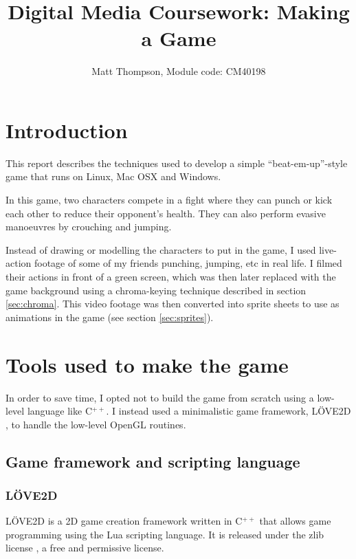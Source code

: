 \documentclass[11pt]{article}
\title{Digital Media Coursework: Making a Game}
\author{Matt Thompson, Module code: CM40198}
\begin{document}
\maketitle
\clearpage
\tableofcontents
\clearpage


\section{Introduction}
This report describes the techniques used to develop a simple ``beat-em-up''-style game that runs on Linux, Mac OSX and Windows.

In this game, two characters compete in a fight where they can punch or kick each other to reduce their opponent's health. They can also perform evasive manoeuvres by crouching and jumping.

Instead of drawing or modelling the characters to put in the game, I used live-action footage of some of my friends punching, jumping, etc in real life. I filmed their actions in front of a green screen, which was then later replaced with the game background using a chroma-keying technique described in section \ref{sec:chroma}. This video footage was then converted into sprite sheets to use as animations in the game (see section \ref{sec:sprites}).

\section{Tools used to make the game}
In order to save time, I opted not to build the game from scratch using a low-level language like C$^{++}$. I instead used a minimalistic game framework, L\"{O}VE2D \cite{love2d}, to handle the low-level OpenGL routines.

\subsection{Game framework and scripting language}
\subsubsection{L\"{O}VE2D} 
L\"{O}VE2D \cite{love2d} is a 2D game creation framework written in C$^{++}$ that allows game programming using the Lua \cite{lua} scripting language. It is released under the zlib license \cite{zlib}, a free and permissive license.
\end{document}
